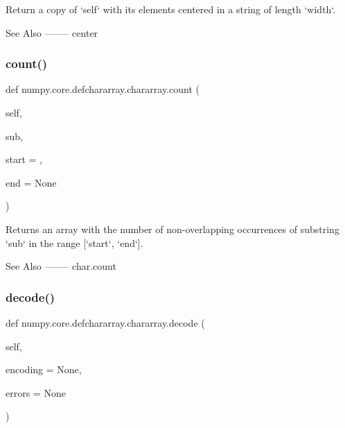 \begin{DoxyVerb}Return a copy of `self` with its elements centered in a
string of length `width`.

See Also
--------
center
\end{DoxyVerb}
 \mbox{\label{classnumpy_1_1core_1_1defchararray_1_1chararray_aa845a74f5ff5dce950aa07a672eb676f}} 
\subsubsection{\texorpdfstring{count()}{count()}}
{\footnotesize\ttfamily def numpy.\+core.\+defchararray.\+chararray.\+count (\begin{DoxyParamCaption}\item[{}]{self,  }\item[{}]{sub,  }\item[{}]{start = {},  }\item[{}]{end = {\ttfamily None} }\end{DoxyParamCaption})}

\begin{DoxyVerb}Returns an array with the number of non-overlapping occurrences of
substring `sub` in the range [`start`, `end`].

See Also
--------
char.count\end{DoxyVerb}
 \mbox{\label{classnumpy_1_1core_1_1defchararray_1_1chararray_a5f2a9b4ad7913678b253aabdf3967488}} 
\subsubsection{\texorpdfstring{decode()}{decode()}}
{\footnotesize\ttfamily def numpy.\+core.\+defchararray.\+chararray.\+decode (\begin{DoxyParamCaption}\item[{}]{self,  }\item[{}]{encoding = {\ttfamily None},  }\item[{}]{errors = {\ttfamily None} }\end{DoxyParamCaption})}

